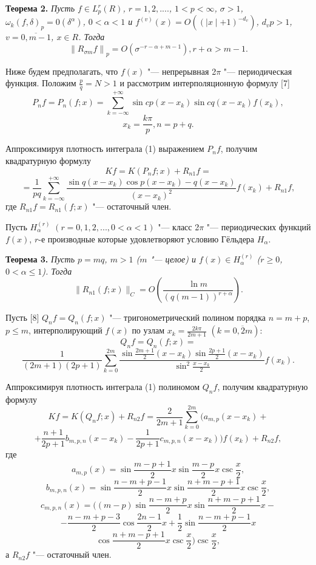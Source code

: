 \textbf{Теорема 2.} \textit{Пусть $f \in L_p^r (R)$, $r =1, 2, ....$, $1 < p < \infty$, $\sigma > 1$, $\omega_k (f, \delta)_p = 0(\delta^{\alpha})$, $0 < \alpha < 1$ и $f^{(v)}(x) = O\left((\mid x \mid +1)^{-d_v}\right)$, $d_v p > 1$, $v = \overline{0, m-1}$, $x \in R$. Тогда}
$$ {\|R_{\sigma m} f \|}_{p} = O\left(\sigma^{-r-\alpha+m-1}\right), r+\alpha > m-1. $$

Ниже будем предполагать, что $f(x)$ "--- непрерывная 2$\pi$ "--- периодическая функция. Положим $\frac{p}{q} = N > 1$ и рассмотрим интерполяционную формулу [7]
$$ P_{n} f = P_n (f;x) = \sum_{k=-\infty}^{+\infty}\sin{c p \left(x - x_k \right)} \sin{c q \left(x - x_k\right)} f\left(x_k\right),$$
$$x_k = \frac{k\pi}{p}, n = p +q.$$

Аппроксимируя плотность интеграла (1) выражением $P_n f$, получим квадратурную формулу
$$ Kf=K(P_n f;x) + R_{n1} f = $$
$$=\frac{1}{p q} \sum_{ k = - \infty}^{+ \infty}\frac{ \sin{q (x-x_k)} \cos{p (x-x_k)}-q(x-x_k)}{(x-x_k)^2}f(x_k)+R_{n1} f, $$
где $R_{n1} f = R_{n1}(f;x)$ "--- остаточный член.

Пусть $H_{\alpha}^{(r)}$ $(r=0, 1, 2, ..., 0 < \alpha < 1)$ "--- класс 2$\pi$ "--- периодических функций $f(x)$, $r$-е производные которые удовлетворяют условию Гёльдера $H_{\alpha}$.

\textbf{Теорема 3.} {\it Пусть $p=m q$, $m > 1$ ($m$ "--- целое) и $f(x) \in H_{\alpha}^{(r)}$ ($r \geqslant 0$, $0 < \alpha \leqslant 1$). Тогда}
\begin{displaymath}
\|R_{n1}(f;x)\|_C = O\left(\frac{\ln{m}}{(q(m-1))^{r+\alpha}}\right).
\end{displaymath}

Пусть [8] $Q_n f = Q_n (f;x)$ "--- тригонометрический полином порядка $n=m+p$, $p \leqslant m$, интерполирующий $f(x)$ по узлам $x_k = \frac{2 k \pi}{2m+1}$ $\left(k=\overline{0,2m}\right)$:
$$Q_n f = Q_n (f;x) =$$
$$\frac{1}{(2m+1)(2p+1)} \sum_{k=0}^{2m} \frac{\sin{\frac{2m+1}{2}}(x-x_k) \sin{\frac{2p+1}{2}}(x-x_k)}{\sin^2{\frac{x-x_k}{2}}}f(x_k).$$

Аппроксимируя плотность интеграла (1) полиномом $Q_n f$, получим квадратурную формулу
$$ Kf=K(Q_n f;x) + R_{n2} f = \frac{2}{2m+1} \sum_{k=0}^{2m}(a_{m,p} (x-x_k)+$$
$$ + \frac{n+1}{2p+1}b_{m,p,n} (x-x_k)-\frac{1}{2p+1} {c_{m,p,n}(x-x_k))f(x_k)}+R_{n2} f, $$
где
\begin{displaymath}
a_{m,p}(x) = \sin{\frac{m-p+1}{2}}x\sin{\frac{m-p}{2}}x\csc{\frac{x}{2}},
\end{displaymath}
\begin{displaymath}
b_{m,p,n}(x)=\sin{\frac{n-m+p-1}{2}}x\sin{\frac{n+m-p+1}{2}}x\csc{\frac{x}{2}},
\end{displaymath}
$$c_{m,p,n}(x)=((m-p)\sin{\frac{n-m+p}{2}}x\sin{\frac{n+m-p+1}{2}}x-$$
$$ - \frac{n-m+p-3}{2}\cos{\frac{2n-1}{2}}x+ \frac{1}{2}\sin{\frac{n-m+p-1}{2}}x$$
$$\cos{\frac{n+m-p+1}{2}} x\csc{\frac{x}{2}})\csc{\frac{x}{2}},$$
а $R_{n2}f$ "--- остаточный член.

